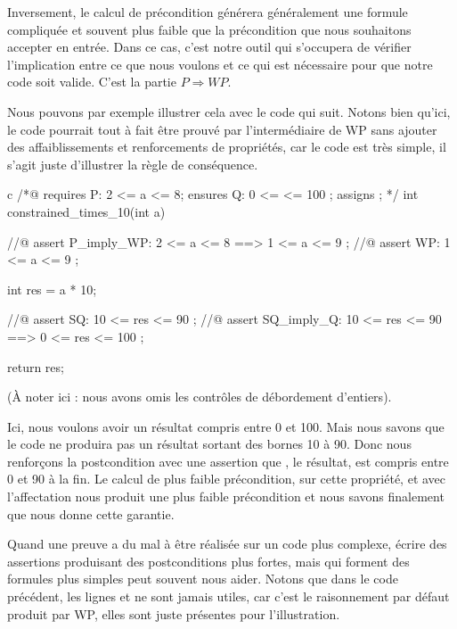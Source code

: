 Inversement, le calcul de précondition générera généralement une formule
compliquée et souvent plus faible que la précondition que nous souhaitons
accepter en entrée. Dans ce cas, c'est notre outil qui s'occupera de vérifier
l'implication entre ce que nous voulons et ce qui est nécessaire pour que notre
code soit valide. C'est la partie $P \Rightarrow WP$.



Nous pouvons par exemple illustrer cela avec le code qui suit. Notons bien qu'ici,
le code pourrait tout à fait être prouvé par l'intermédiaire de WP sans ajouter des
affaiblissements et renforcements de propriétés, car le code est très simple, il
s'agit juste d'illustrer la règle de conséquence.



\begin{CodeBlock}{c}
/*@
  requires P: 2 <= a <= 8;
  ensures  Q: 0 <= \result <= 100 ;
  assigns  \nothing ;
*/
int constrained_times_10(int a){
  //@ assert P_imply_WP: 2 <= a <= 8 ==> 1 <= a <= 9 ;
  //@ assert WP:         1 <= a <= 9 ;

  int res = a * 10;

  //@ assert SQ:         10 <= res <= 90 ;
  //@ assert SQ_imply_Q: 10 <= res <= 90 ==> 0 <= res <= 100 ;

  return res;
}
\end{CodeBlock}



(À noter ici : nous avons omis les contrôles de débordement d'entiers).



Ici, nous voulons avoir un résultat compris entre 0 et 100. Mais nous savons que
le code ne produira pas un résultat sortant des bornes 10 à 90. Donc nous
renforçons la postcondition avec une assertion que , le résultat, est compris
entre 0 et 90 à la fin. Le calcul de plus faible précondition, sur cette propriété,
et avec l'affectation  nous produit une plus faible précondition
 et nous savons finalement que  nous donne cette garantie.



Quand une preuve a du mal à être réalisée sur un code plus complexe, écrire des
assertions produisant des postconditions plus fortes, mais qui forment des formules
plus simples peut souvent nous aider. Notons que dans le code précédent, les lignes
 et  ne sont jamais utiles, car c'est le raisonnement par
défaut produit par WP, elles sont juste présentes pour l'illustration.



